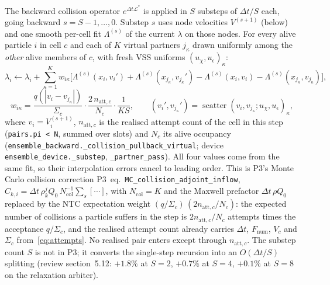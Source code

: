 \documentclass[11pt,a4paper]{article}
\numberwithin{equation}{section}
\newcommand{\code}[1]{\texttt{#1}}
\newcommand{\Lam}{\Lambda}
\newcommand{\pref}[1]{P3~eq.~\code{#1}}
\begin{document}
The backward collision operator $e^{\Delta t \mathcal L^*}$ is applied in $S$ substeps
of $\Delta t / S$ each, going backward $s = S-1, \dots, 0$.  Substep $s$ uses node
velocities $V^{(s+1)}$ (below) and one smooth per-cell fit $\Lam^{(s)}$ of the current
$\lambda$ on those nodes.  For every alive particle $i$ in cell $c$ and each of
$K$ virtual partners $j_\kappa$ drawn uniformly among the \emph{other} alive members of
$c$, with fresh VSS uniforms $(u_\chi, u_\epsilon)_{\kappa}$:
\begin{equation}
\label{eq:virtual}
\lambda_i \leftarrow \lambda_i + \sum_{\kappa=1}^{K} w_{i\kappa}
\Big[\Lam^{(s)}(x_i, v_i') + \Lam^{(s)}(x_{j_\kappa}, v_{j_\kappa}') - \Lam^{(s)}(x_i, v_i) - \Lam^{(s)}(x_{j_\kappa}, v_{j_\kappa})\Big],
\end{equation}
\begin{equation}
\label{eq:virtual-weight}
w_{i\kappa} = \frac{q(|v_i - v_{j_\kappa}|)}{\Sigma_c}\cdot\frac{2\, n_{\mathrm{att},c}}{N_c}\cdot\frac{1}{K S},
\qquad (v_i', v_{j_\kappa}') = \operatorname{scatter}(v_i, v_{j_\kappa}; u_\chi, u_\epsilon)_\kappa ,
\end{equation}
where $v_i = V^{(s+1)}_i$, $n_{\mathrm{att},c}$ is the realised attempt count of the cell
in this step (\code{pairs.pi < N}, summed over slots) and $N_c$ its alive occupancy
(\code{ensemble\_backward.\_collision\_pullback\_virtual};
device \code{ensemble\_device.\_substep}, \code{\_partner\_pass}).  All four values come
from the same fit, so their interpolation errors cancel to leading order.  This is
P3's Monte Carlo collision correction \pref{MC\_collision\_adjoint\_inflow},
$\widehat C_{k,i} = \Delta t\, \rho^j_k Q_0\, N_{\mathrm{col}}^{-1} \sum_s [\cdots]$, with
$N_{\mathrm{col}} = K$ and the Maxwell prefactor $\Delta t\, \rho Q_0$ replaced by the NTC
expectation weight $(q/\Sigma_c)\,(2 n_{\mathrm{att},c}/N_c)$: the expected number of
collisions a particle suffers in the step is $2 n_{\mathrm{att},c}/N_c$ attempts times
the acceptance $q/\Sigma_c$, and the realised attempt count already carries
$\Delta t$, $F_{\mathrm{num}}$, $V_c$ and $\Sigma_c$ from~\eqref{eq:attempts}.  No realised
pair enters except through $n_{\mathrm{att},c}$.  The substep count $S$ is not in P3;
it converts the single-step recursion into an $O(\Delta t/S)$ splitting
(review section~5.12: $+1.8\%$ at $S=2$, $+0.7\%$ at $S=4$, $+0.1\%$ at $S=8$ on the relaxation arbiter).
\end{document}
